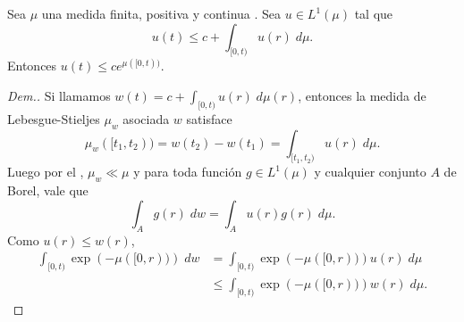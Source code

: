 \begin{lem}\label{Lema gronwall}
	Sea $\mu$ una medida finita, positiva y continua . Sea $u\in L^1(\mu) $ tal que 
	\begin{equation*}
		u(t)\leq c+\int_{[0,t)}u(r) \; d\mu.
	\end{equation*}
Entonces $u(t)\leq ce^{\mu([0,t))}$.
\end{lem}
\begin{proof}[Dem.]
	Si llamamos $w(t)= c+\displaystyle\int_{[0,t)}u(r) \; d\mu(r)$, entonces  la medida de Lebesgue-Stieljes $\mu_{w}$ asociada $w$ satisface
	$$\mu_{w}([t_1,t_2))=w(t_2)-w(t_1)=\int_{[t_1,t_2)}u(r)\; d\mu.$$
 Luego por el  \cite[Teorema 3.5]{folland},  $\mu_w\ll \mu$ y para toda función $g\in L^1(\mu)$ y cualquier conjunto $A$ de Borel, vale que 
$$\displaystyle\int_Ag(r)\; dw=\int_Au(r)g(r)\; d\mu.$$
	Como $u(r)\leq w(r)$, 
	\begin{equation}
	\begin{split}
  \int_{[0,t)}\exp\left( -\mu([0,r))\right)\; dw &= \int_{[0,t)}\exp\left( -\mu([0,r))\right)u(r)\; d\mu\\
  &\leq \int_{[0,t)}\exp\left( -\mu([0,r))\right)w(r)\; d\mu.
\label{eq:lema 1}
	\end{split}	\end{equation}



\end{proof}
